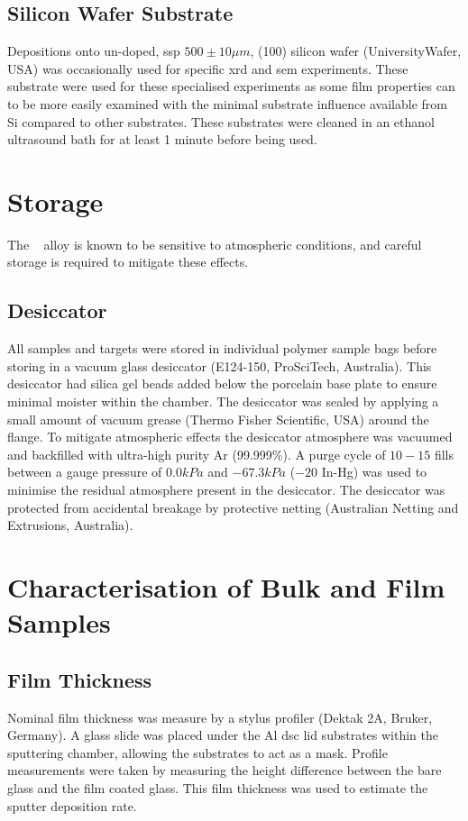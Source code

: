 \subsection{Silicon Wafer Substrate}
Depositions onto un-doped, \gls{ssp} $500 \pm 10 \mu m$,  (100) silicon wafer (UniversityWafer, USA) was occasionally used for specific \gls{xrd} and \gls{sem} experiments. These substrate were used for these specialised experiments as some film properties can to be more easily examined with the minimal substrate influence available from Si compared to other substrates. These substrates were cleaned in an ethanol ultrasound bath for at least 1 minute before being used. 

\section{Storage}
The \MgZnCa~ alloy is known to be sensitive to atmospheric conditions, and careful storage is required to mitigate these effects. 

\subsection{Desiccator}
All samples and targets were stored in individual polymer sample bags before storing in a vacuum glass desiccator (E124-150, ProSciTech, Australia). This desiccator had silica gel beads added below the porcelain base plate to ensure minimal moister within the chamber. The desiccator was sealed by applying a small amount of vacuum grease (Thermo Fisher Scientific, USA) around the flange. To mitigate atmospheric effects the desiccator atmosphere was vacuumed and backfilled with ultra-high purity Ar (99.999\%). A purge cycle of $10 - 15$ fills between a gauge pressure of $0.0 kPa$ and $-67.3 kPa$ ($-20$ In-Hg) was used to minimise the residual atmosphere present in the desiccator. The desiccator was protected from accidental breakage by protective netting (Australian Netting and Extrusions, Australia).

\section{Characterisation of Bulk and Film Samples}

\subsection{Film Thickness}
Nominal film thickness was measure by a stylus profiler (Dektak 2A, Bruker, Germany). A glass slide was placed under the Al \gls{dsc} lid substrates within the sputtering chamber, allowing the substrates to act as a mask. Profile measurements were taken by measuring the height difference between the bare glass and the film coated glass. This film thickness was used to estimate the sputter deposition rate.  

